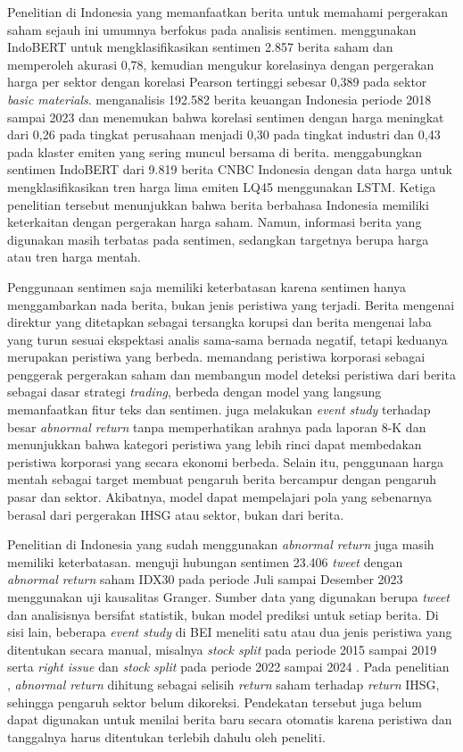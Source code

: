 Penelitian di Indonesia yang memanfaatkan berita untuk memahami pergerakan saham sejauh ini umumnya berfokus pada analisis sentimen. \textcite{attar2024} menggunakan IndoBERT untuk mengklasifikasikan sentimen 2.857 berita saham dan memperoleh akurasi 0,78, kemudian mengukur korelasinya dengan pergerakan harga per sektor dengan korelasi Pearson tertinggi sebesar 0,389 pada sektor \emph{basic materials}. \textcite{alamsyah2025} menganalisis 192.582 berita keuangan Indonesia periode 2018 sampai 2023 dan menemukan bahwa korelasi sentimen dengan harga meningkat dari 0,26 pada tingkat perusahaan menjadi 0,30 pada tingkat industri dan 0,43 pada klaster emiten yang sering muncul bersama di berita. \textcite{kusuma2026} menggabungkan sentimen IndoBERT dari 9.819 berita CNBC Indonesia dengan data harga untuk mengklasifikasikan tren harga lima emiten LQ45 menggunakan LSTM. Ketiga penelitian tersebut menunjukkan bahwa berita berbahasa Indonesia memiliki keterkaitan dengan pergerakan harga saham. Namun, informasi berita yang digunakan masih terbatas pada sentimen, sedangkan targetnya berupa harga atau tren harga mentah.

Penggunaan sentimen saja memiliki keterbatasan karena sentimen hanya menggambarkan nada berita, bukan jenis peristiwa yang terjadi. Berita mengenai direktur yang ditetapkan sebagai tersangka korupsi dan berita mengenai laba yang turun sesuai ekspektasi analis sama-sama bernada negatif, tetapi keduanya merupakan peristiwa yang berbeda. \textcite{zhou2021} memandang peristiwa korporasi sebagai penggerak pergerakan saham dan membangun model deteksi peristiwa dari berita sebagai dasar strategi \emph{trading}, berbeda dengan model yang langsung memanfaatkan fitur teks dan sentimen. \textcite{dolphin2026} juga melakukan \emph{event study} terhadap besar \emph{abnormal return} tanpa memperhatikan arahnya pada laporan 8-K dan menunjukkan bahwa kategori peristiwa yang lebih rinci dapat membedakan peristiwa korporasi yang secara ekonomi berbeda. Selain itu, penggunaan harga mentah sebagai target membuat pengaruh berita bercampur dengan pengaruh pasar dan sektor. Akibatnya, model dapat mempelajari pola yang sebenarnya berasal dari pergerakan IHSG atau sektor, bukan dari berita.

Penelitian di Indonesia yang sudah menggunakan \emph{abnormal return} juga masih memiliki keterbatasan. \textcite{elli2025} menguji hubungan sentimen 23.406 \emph{tweet} dengan \emph{abnormal return} saham IDX30 pada periode Juli sampai Desember 2023 menggunakan uji kausalitas Granger. Sumber data yang digunakan berupa \emph{tweet} dan analisisnya bersifat statistik, bukan model prediksi untuk setiap berita. Di sisi lain, beberapa \emph{event study} di BEI meneliti satu atau dua jenis peristiwa yang ditentukan secara manual, misalnya \emph{stock split} pada periode 2015 sampai 2019 \autocite{fauzi2021} serta \emph{right issue} dan \emph{stock split} pada periode 2022 sampai 2024 \autocite{sudirman2026}. Pada penelitian \textcite{sudirman2026}, \emph{abnormal return} dihitung sebagai selisih \emph{return} saham terhadap \emph{return} IHSG, sehingga pengaruh sektor belum dikoreksi. Pendekatan tersebut juga belum dapat digunakan untuk menilai berita baru secara otomatis karena peristiwa dan tanggalnya harus ditentukan terlebih dahulu oleh peneliti.

